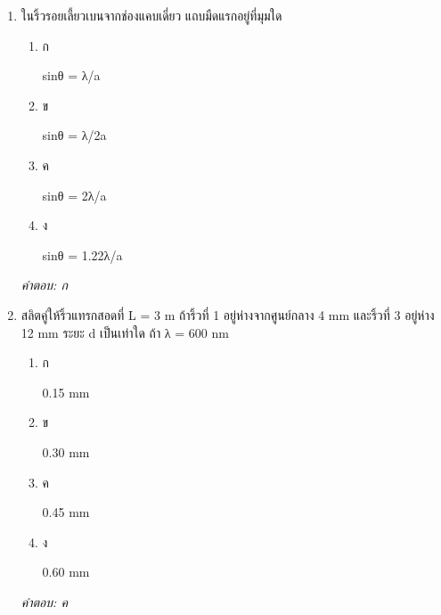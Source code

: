 \documentclass[12pt]{article}
\begin{document}
\begin{enumerate}[label=\arabic*., itemsep=0.5\baselineskip, topsep=0.5\baselineskip, leftmargin=*]
\item ในริ้วรอยเลี้ยวเบนจากช่องแคบเดี่ยว แถบมืดแรกอยู่ที่มุมใด
\begin{enumerate}[label=\alph*)., itemsep=0.3\baselineskip, topsep=0.3\baselineskip]
\item ก\ 
\begin{minipage}[t]{0.9\linewidth}
\raggedright sinθ = λ/a
\end{minipage}
\item ข\ 
\begin{minipage}[t]{0.9\linewidth}
\raggedright sinθ = λ/2a
\end{minipage}
\item ค\ 
\begin{minipage}[t]{0.9\linewidth}
\raggedright sinθ = 2λ/a
\end{minipage}
\item ง\ 
\begin{minipage}[t]{0.9\linewidth}
\raggedright sinθ = 1.22λ/a
\end{minipage}
\end{enumerate}
\vspace{-0.3\baselineskip}
\begin{small}
\textit{คำตอบ: ก}
\end{small}

\item สลิตคู่ให้ริ้วแทรกสอดที่ L = 3 m ถ้าริ้วที่ 1 อยู่ห่างจากศูนย์กลาง 4 mm และริ้วที่ 3 อยู่ห่าง 12 mm ระยะ d เป็นเท่าใด ถ้า λ = 600 nm
\begin{enumerate}[label=\alph*)., itemsep=0.3\baselineskip, topsep=0.3\baselineskip]
\item ก\ 
\begin{minipage}[t]{0.9\linewidth}
\raggedright 0.15 mm
\end{minipage}
\item ข\ 
\begin{minipage}[t]{0.9\linewidth}
\raggedright 0.30 mm
\end{minipage}
\item ค\ 
\begin{minipage}[t]{0.9\linewidth}
\raggedright 0.45 mm
\end{minipage}
\item ง\ 
\begin{minipage}[t]{0.9\linewidth}
\raggedright 0.60 mm
\end{minipage}
\end{enumerate}
\vspace{-0.3\baselineskip}
\begin{small}
\textit{คำตอบ: ค}
\end{small}


\end{enumerate}
\end{document}
